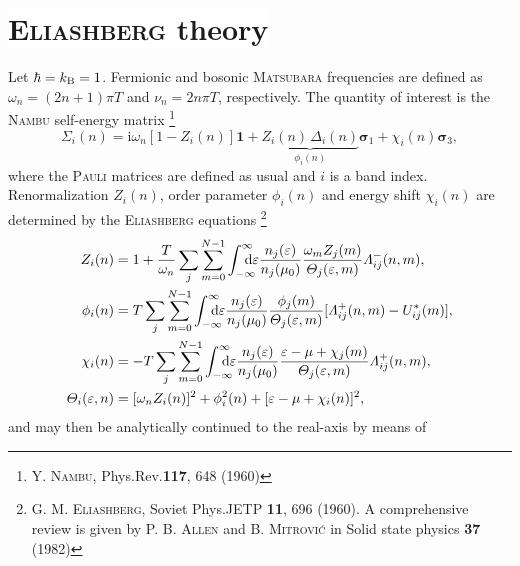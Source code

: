 \documentclass[a4paper]{article}
\def\D{\mathrm d}
\def\I{\mathrm i}
\def\sub#1{\sb{\mathrm{#1}}}
\def\from#1{\sb{\mathrlap{#1}}}
\def\till#1{\sp{\mathrlap{#1}}}
\let\vec\boldsymbol
\let\Delta\varDelta
\let\epsilon\varepsilon
\let\Lambda\varLambda
\let\Sigma\varSigma
\let\Theta\varTheta
\def\headline#1{\section*{%
   \normalsize\normalfont%
   \rlap{\rule[0.5ex]\textwidth{0.4pt}}%
   \qquad\colorbox{white}{#1}%
   }}
\begin{document}
   \headline{\textsc{Eliashberg} theory}

   Let $\hbar = k \sub B = 1$. Fermionic and bosonic \textsc{Matsubara}
   frequencies are defined as $\omega_n = (2 n + 1) \pi T$ and $\nu_n = 2 n \pi
   T$, respectively. The quantity of interest is the \textsc{Nambu} self-energy
   matrix%
   \footnote{Y. \textsc{Nambu}, Phys.\@ Rev.\@ \textbf{117}, 648 (1960)}
   \begin{equation*}
      \vec \Sigma_i(n)
      = \I \omega_n [1 - Z_i(n)] \vec 1
      + \underbrace{Z_i(n) \, \Delta_i(n)}
      _ {\displaystyle \phi_i(n)} \vec \sigma_1
      + \chi_i(n) \vec \sigma_3,
   \end{equation*}
   where the \textsc{Pauli} matrices are defined as usual and $i$ is a band
   index. Renormalization $Z_i(n)$, order parameter $\phi_i(n)$ and energy shift
   $\chi_i(n)$ are determined by the \textsc{Eliashberg} equations%
   \footnote{%
      G. M. \textsc{Eliashberg}, Soviet Phys.\@ JETP \textbf{11}, 696 (1960).
      \newline
      A comprehensive review is given by P. B. \textsc{Allen} and B.
      \textsc{Mitrović} in Solid state physics \textbf{37} (1982)
      }
   \begin{equation}
      \begin{split}
         Z_i(n) &= 1 + \frac T {\omega_n} \sum_j \sum_{m = 0}^{N - 1}
         \int \from{-\infty} \till \infty \D \epsilon
         \frac{n_j(\epsilon)}{n_j(\mu_0)}
         \frac{\omega_m Z_j (m)}{\Theta_j(\epsilon, m)}
         \Lambda_{i j}^-(n, m),
         \\
         \phi_i(n) &= T \sum_j \sum_{m = 0}^{N - 1}
         \int \from{-\infty} \till \infty \D \epsilon
         \frac{n_j(\epsilon)}{n_j(\mu_0)}
         \frac{\phi_j(m)}{\Theta_j(\epsilon, m)}
         [\Lambda_{i j}^+(n, m) - U^*_{i j}(m)],
         \\
         \chi_i(n) &= -T \sum_j \sum_{m = 0}^{N - 1}
         \int \from{-\infty} \till \infty \D \epsilon
         \frac{n_j(\epsilon)}{n_j(\mu_0)}
         \frac{\epsilon - \mu + \chi_j(m)}{\Theta_j(\epsilon, m)}
         \Lambda_{i j}^+(n, m),
         \\
         \Theta_i(\epsilon, n) &=
         [\omega_n Z_i(n)]^2 + \phi_i^2(n) + [\epsilon - \mu + \chi_i(n)]^2,
      \end{split}
      \label{Eliashberg equations}
   \end{equation}
   and may then be analytically continued to the real-axis by means of
\end{document}
